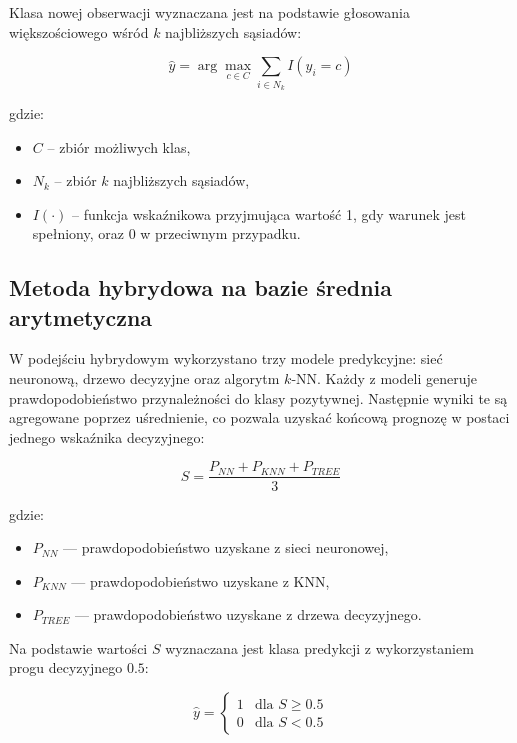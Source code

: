 \documentclass[twoside]{customStyle}
\begin{document}
Klasa nowej obserwacji wyznaczana jest na podstawie głosowania większościowego wśród $k$ najbliższych sąsiadów:

\begin{equation}
\hat{y} =
\arg\max_{c \in C}
\sum_{i \in N_k}
I(y_i = c)
\end{equation}

gdzie:
\begin{itemize}
    \item $C$ -- zbiór możliwych klas,
    \item $N_k$ -- zbiór $k$ najbliższych sąsiadów,
    \item $I(\cdot)$ -- funkcja wskaźnikowa przyjmująca wartość 1, gdy warunek jest spełniony, oraz 0 w przeciwnym przypadku.
\end{itemize}

\subsection{Metoda hybrydowa na bazie średnia arytmetyczna}
W podejściu hybrydowym wykorzystano trzy modele predykcyjne: sieć neuronową, drzewo decyzyjne oraz algorytm $k$-NN. Każdy z modeli generuje prawdopodobieństwo przynależności do klasy pozytywnej. Następnie wyniki te są agregowane poprzez uśrednienie, co pozwala uzyskać końcową prognozę w postaci jednego wskaźnika decyzyjnego:

\begin{equation}
S = \frac{P_{NN} + P_{KNN} + P_{TREE}}{3}
\end{equation}

gdzie:
\begin{itemize}
	\item $P_{NN}$ --- prawdopodobieństwo uzyskane z sieci neuronowej,
	\item $P_{KNN}$ --- prawdopodobieństwo uzyskane z KNN,
	\item $P_{TREE}$ --- prawdopodobieństwo uzyskane z drzewa decyzyjnego.
\end{itemize}

Na podstawie wartości $S$ wyznaczana jest klasa predykcji z wykorzystaniem progu decyzyjnego $0.5$:

\begin{equation}
\hat{y} =
\begin{cases}
1 & \text{dla } S \geq 0.5 \\
0 & \text{dla } S < 0.5
\end{cases}
\end{equation}
\end{document}
